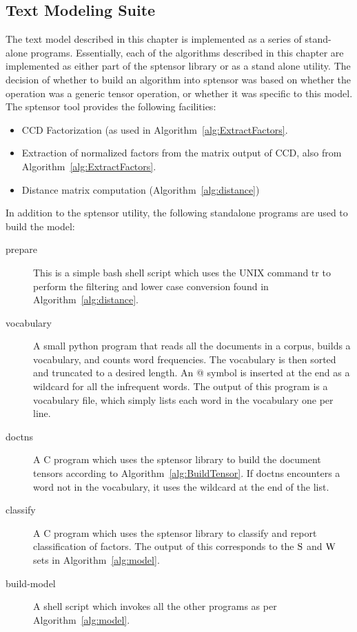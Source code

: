 \documentclass[../ut-dissertation.tex]{subfiles}
\begin{document}
\subsection{Text Modeling Suite}
The text model described in this chapter is implemented as a series of
stand-alone programs.  Essentially, each of the algorithms described
in this chapter are implemented as either part of the sptensor library
or as a stand alone utility.  The decision of whether to build an
algorithm into sptensor was based on whether the operation was a
generic tensor operation, or whether it was specific to this model.
The sptensor tool provides the following facilities:
\begin{itemize}
\item CCD Factorization (as used in
  Algorithm~\ref{alg:ExtractFactors}.
\item Extraction of normalized factors from the matrix output of CCD,
  also from Algorithm~\ref{alg:ExtractFactors}.
\item Distance matrix computation (Algorithm~\ref{alg:distance})
\end{itemize}

In addition to the sptensor utility, the following standalone
programs are used to build the model:
\begin{description}
\item[prepare] This is a simple bash shell script which uses the UNIX
  command tr to perform the filtering and lower case conversion found
  in Algorithm~\ref{alg:distance}.
\item[vocabulary] A small python program that reads all the documents
  in a corpus, builds a vocabulary, and counts word frequencies.  The
  vocabulary is then sorted and truncated to a desired length.  An @
  symbol is inserted at the end as a wildcard for all the infrequent
  words.  The output of this program is a vocabulary file, which
  simply lists each word in the vocabulary one per line.
\item[doctns] A C program which uses the sptensor library to build the
  document tensors according to Algorithm~\ref{alg:BuildTensor}.  If
  doctns encounters a word not in the vocabulary, it uses the wildcard
  at the end of the list.
\item[classify] A C program which uses the sptensor library to
  classify and report classification of factors.  The output of this
  corresponds to the $\mathrm{S}$ and $\mathrm{W}$ sets in Algorithm~\ref{alg:model}.
\item[build-model] A shell script which invokes all the other
  programs as per Algorithm~\ref{alg:model}.
\end{description}
\end{document}
